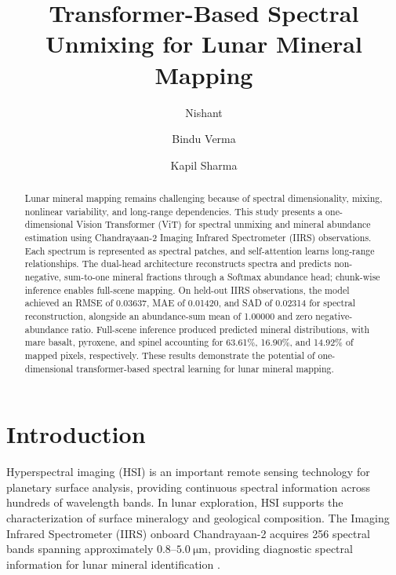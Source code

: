 \documentclass[runningheads]{llncs}
\begin{document}
\title{Transformer-Based Spectral Unmixing for Lunar Mineral Mapping}
\author{
Nishant \and
Bindu Verma \and
Kapil Sharma
}


\maketitle              
%

\begin{abstract}
Lunar mineral mapping remains challenging because of spectral dimensionality, mixing, nonlinear variability, and long-range dependencies. This study presents a one-dimensional Vision Transformer (ViT) for spectral unmixing and mineral abundance estimation using Chandrayaan-2 Imaging Infrared Spectrometer (IIRS) observations. Each spectrum is represented as spectral patches, and self-attention learns long-range relationships. The dual-head architecture reconstructs spectra and predicts non-negative, sum-to-one mineral fractions through a Softmax abundance head; chunk-wise inference enables full-scene mapping. On held-out IIRS observations, the model achieved an RMSE of 0.03637, MAE of 0.01420, and SAD of 0.02314 for spectral reconstruction, alongside an abundance-sum mean of 1.00000 and zero negative-abundance ratio. Full-scene inference produced predicted mineral distributions, with mare basalt, pyroxene, and spinel accounting for 63.61\%, 16.90\%, and 14.92\% of mapped pixels, respectively. These results demonstrate the potential of one-dimensional transformer-based spectral learning for lunar mineral mapping.






\end{abstract}


\section{Introduction}

Hyperspectral imaging (HSI) is an important remote sensing technology
for planetary surface analysis, providing continuous spectral information
across hundreds of wavelength bands. In lunar exploration, HSI supports
the characterization of surface mineralogy and geological composition.
The Imaging Infrared Spectrometer (IIRS) onboard Chandrayaan-2 acquires
256 spectral bands spanning approximately $0.8$--$5.0~\si{\micro\metre}$,
providing diagnostic spectral information for lunar mineral
identification \cite{chowdhury2020iirs,chauhan2021hydration}.
\end{document}
